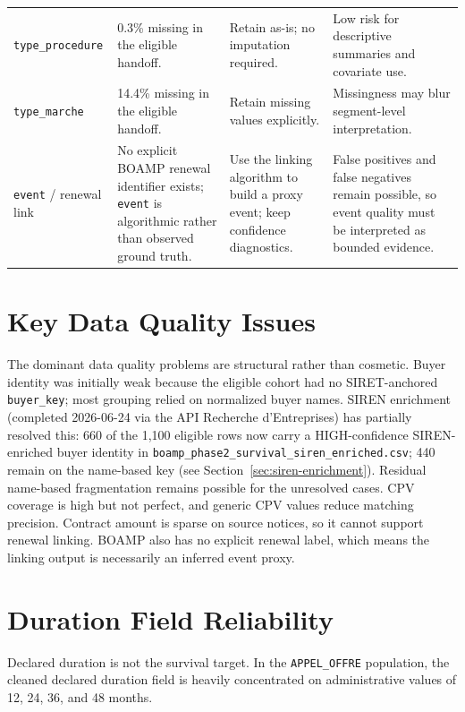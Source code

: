 \documentclass[11pt,a4paper]{article}
\begin{document}
\begin{landscape}
\begin{table}[p]
\begin{tabularx}{\linewidth}{@{}L{4.7cm}L{4.2cm}Y Y@{}}
\texttt{type\_procedure} & 0.3\% missing in the eligible handoff. & Retain as-is; no imputation required. & Low risk for descriptive summaries and covariate use. \\
\texttt{type\_marche} & 14.4\% missing in the eligible handoff. & Retain missing values explicitly. & Missingness may blur segment-level interpretation. \\
\texttt{event} / renewal link & No explicit BOAMP renewal identifier exists; \texttt{event} is algorithmic rather than observed ground truth. & Use the linking algorithm to build a proxy event; keep confidence diagnostics. & False positives and false negatives remain possible, so event quality must be interpreted as bounded evidence. \\
\bottomrule
\end{tabularx}
\end{table}
\end{landscape}

\section{Key Data Quality Issues}

The dominant data quality problems are structural rather than cosmetic. Buyer
identity was initially weak because the eligible cohort had no SIRET-anchored
\texttt{buyer\_key}; most grouping relied on normalized buyer names. SIREN
enrichment (completed 2026-06-24 via the API Recherche d'Entreprises) has
partially resolved this: 660 of the 1,100 eligible rows now carry a
HIGH-confidence SIREN-enriched buyer identity in
\texttt{boamp\_phase2\_survival\_siren\_enriched.csv}; 440 remain on the
name-based key (see Section~\ref{sec:siren-enrichment}). Residual name-based
fragmentation remains possible for the unresolved cases. CPV coverage is high
but not perfect, and generic CPV values reduce matching precision. Contract
amount is sparse on source notices, so it cannot support renewal linking. BOAMP
also has no explicit renewal label, which means the linking output is
necessarily an inferred event proxy.

\section{Duration Field Reliability}

Declared duration is not the survival target. In the \texttt{APPEL\_OFFRE}
population, the cleaned declared duration field is heavily concentrated on
administrative values of 12, 24, 36, and 48 months.
\end{document}
